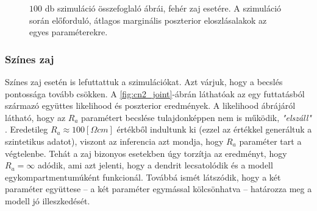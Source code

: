 \begin{figure}[h!]
	\centering
	\caption[\textit{Stick and ball}, két paraméter, fehér zaj eredmény]{$100$ db szimuláció összefoglaló ábrái, fehér zaj esetére. A szimuláció során előforduló, átlagos marginális poszterior eloszlásalakok az egyes paraméterekre.}
	\label{fig:wn3}
\end{figure}

\subsubsection{Színes zaj}
Színes zaj esetén is lefuttattuk a szimulációkat. Azt várjuk, hogy a becslés pontossága tovább csökken. A \ref{fig:cn2_joint}-ábrán láthatóak az egy futtatásból származó együttes likelihood és poszterior eredmények. A likelihood ábrájáról látható, hogy az $R_a$ paramétert becslése tulajdonképpen nem is működik, \textit{"elszáll" }. Eredetileg $R_a \approx 100 \left[\Omega cm\right]$ értékből indultunk ki (ezzel az értékkel generáltuk a szintetikus adatot), viszont az inferencia azt mondja, hogy $R_a$ paraméter tart a végtelenbe. Tehát a zaj bizonyos esetekben úgy torzítja az eredményt, hogy $R_a = \infty$ adódik, ami azt jelenti, hogy a dendrit lecsatolódik és a modell egykompartmentumúként funkcionál. Továbbá ismét látszódik, hogy a két paraméter együttese -- a két paraméter egymással kölcsönhatva -- határozza meg a modell jó illeszkedését.

